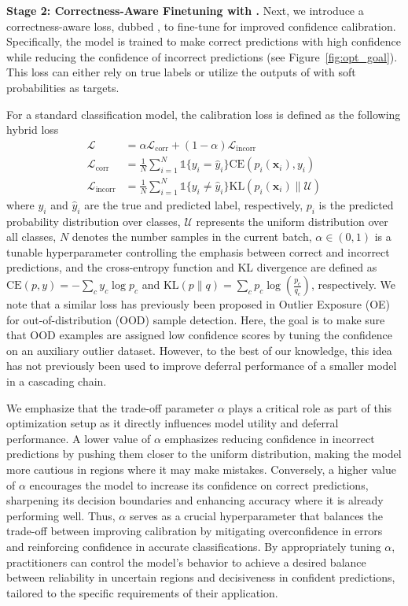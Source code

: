 \sloppy
\textbf{Stage 2: Correctness-Aware Finetuning with \loss.} Next, we introduce a correctness-aware loss, dubbed \loss, to fine-tune \smallmodel for improved confidence calibration. Specifically, the model is trained to make correct predictions with high confidence while reducing the confidence of incorrect predictions (see Figure~\ref{fig:opt_goal}). This loss can either rely on true labels or utilize the outputs of \bigmodel with soft probabilities as targets. 


For a standard classification model, the calibration loss is defined as the following hybrid loss
\begin{align}
\mathcal{L} &= \alpha \mathcal{L}_\text{corr} + (1 - \alpha) \mathcal{L}_\text{incorr} \\
\mathcal{L}_\text{corr} &= \frac{1}{N} \sum_{i=1}^{N} \mathds{1}\{ y_i = \hat{y}_i \} \text{CE}(p_i(\mathbf{x}_i), y_i) \\
\mathcal{L}_\text{incorr} &= \frac{1}{N} \sum_{i=1}^{N} \mathds{1}\{ y_i \neq \hat{y}_i \} \text{KL}\left(p_i(\mathbf{x}_i) \parallel \mathcal{U}\right)
\end{align}
where  \( y_i \) and \( \hat{y}_i \) are the true and predicted label, respectively, \( p_i \) is the predicted probability distribution over classes, \( \mathcal{U} \) represents the uniform distribution over all classes, \( N \) denotes the number samples in the current batch, \( \alpha \in (0, 1) \) is a tunable hyperparameter controlling the emphasis between correct and incorrect predictions, and the cross-entropy function and KL divergence are defined as \( \text{CE}(p, y) = -\sum_{c} y_c \log p_c \) and \( \text{KL}(p \parallel q) = \sum_{c} p_c \log ( \frac{p_c}{q_c}) \), respectively. We note that a similar loss has previously been proposed in Outlier Exposure (OE)~\citep{hendrycks2018deep} for out-of-distribution (OOD) sample detection. Here, the goal is to make sure that OOD examples are assigned low confidence scores by tuning the confidence on an auxiliary outlier dataset. However, to the best of our knowledge, this idea has not previously been used to improve deferral performance of a smaller model in a cascading chain.

We emphasize that the trade-off parameter $\alpha$ plays a critical role as part of this optimization setup as it directly influences model utility and deferral performance. A lower value of \(\alpha\) emphasizes reducing confidence in incorrect predictions by pushing them closer to the uniform distribution, making the model more cautious in regions where it may make mistakes. Conversely, a higher value of \(\alpha\) encourages the model to increase its confidence on correct predictions, sharpening its decision boundaries and enhancing accuracy where it is already performing well. Thus, \(\alpha\) serves as a crucial hyperparameter that balances the trade-off between improving calibration by mitigating overconfidence in errors and reinforcing confidence in accurate classifications. By appropriately tuning \(\alpha\), practitioners can control the model’s behavior to achieve a desired balance between reliability in uncertain regions and decisiveness in confident predictions, tailored to the specific requirements of their application.

